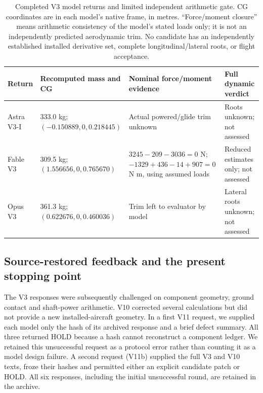 \documentclass[11pt,a4paper]{article}
\begin{document}
\begin{table}[H]\centering\footnotesize
\caption{Completed V3 model returns and limited independent arithmetic gate. CG coordinates are in each model's native frame, in metres. ``Force/moment closure'' means arithmetic consistency of the model's stated loads only; it is not an independently predicted aerodynamic trim. No candidate has an independently established installed derivative set, complete longitudinal/lateral roots, or flight acceptance.}\label{tab:v3returns}
\begin{tabularx}{\linewidth}{lXXX}\toprule
Return & Recomputed mass and CG & Nominal force/moment evidence & Full dynamic verdict\\\midrule
Astra V3-I & 333.0 kg; $(-0.150889,0,0.218445)$ & Actual powered/glide trim unknown & Roots unknown; not assessed\\
Fable V3 & 309.5 kg; $(1.556656,0,0.765670)$ & $3245-209-3036=0$ N; $-1329+436-14+907=0$ N m, using assumed loads & Reduced estimates only; not assessed\\
Opus V3 & 361.3 kg; $(0.622676,0,0.460036)$ & Trim left to evaluator by model & Lateral roots unknown; not assessed\\\bottomrule
\end{tabularx}
\end{table}

\subsection{Source-restored feedback and the present stopping point}
The V3 responses were subsequently challenged on component geometry, ground contact and shaft-power arithmetic. V10 corrected several calculations but did not provide a new installed-aircraft geometry. In a first V11 request, we supplied each model only the hash of its archived response and a brief defect summary. All three returned HOLD because a hash cannot reconstruct a component ledger. We retained this unsuccessful request as a protocol error rather than counting it as a model design failure. A second request (V11b) supplied the full V3 and V10 texts, froze their hashes and permitted either an explicit candidate patch or HOLD. All six responses, including the initial unsuccessful round, are retained in the archive.
\end{document}
